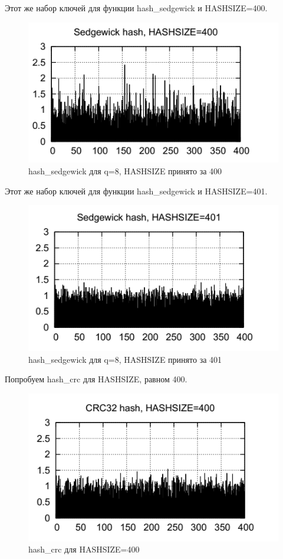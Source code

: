 \documentclass{beamer}
\begin{document}
\begin{frame}[t]
	Этот же набор ключей для функции hash\_sedgewick и HASHSIZE=400.
	\begin{figure}[h]
		\centering
		\includegraphics[scale=0.7]{images/lec08-pic05.png}
		\caption{hash\_sedgewick для q=8, HASHSIZE принято за 400}
	\end{figure}
\end{frame}

\begin{frame}[t]
	Этот же набор ключей для функции hash\_sedgewick и HASHSIZE=401.
	\begin{figure}[h]
		\centering
		\includegraphics[scale=0.7]{images/lec08-pic06.png}
		\caption{hash\_sedgewick для q=8, HASHSIZE принято за 401}
	\end{figure}
\end{frame}

\begin{frame}[t]
	Попробуем hash\_crc для HASHSIZE, равном 400.
	\begin{figure}[h]
		\centering
		\includegraphics[scale=0.7]{images/lec08-pic07.png}
		\caption{hash\_crc для HASHSIZE=400}
	\end{figure}
\end{frame}
\end{document}
